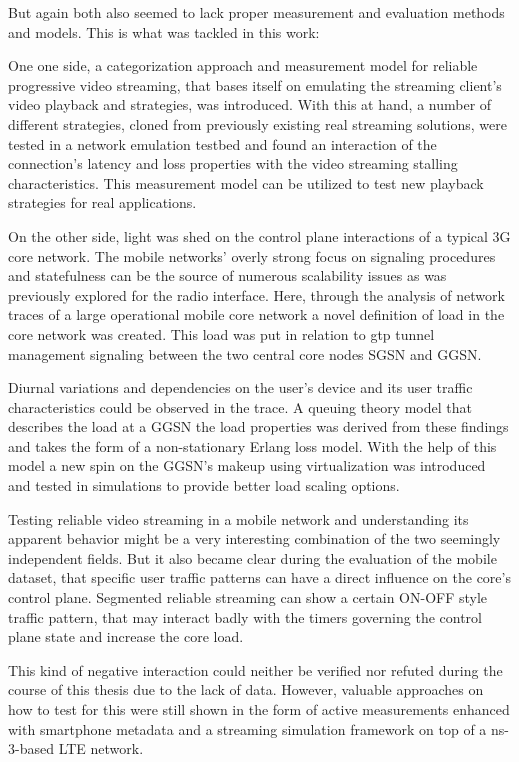 But again both also seemed to lack proper measurement and evaluation methods and models. This is what was tackled in this work: 

One one side, a categorization approach and measurement model for reliable progressive video streaming, that bases itself on emulating the streaming client's video playback and strategies, was introduced. With this at hand, a number of different strategies, cloned from previously existing real streaming solutions, were tested in a network emulation testbed and found an interaction of the connection's latency and loss properties with the video streaming stalling characteristics. This measurement model can be utilized to test new playback strategies for real applications.

On the other side, light was shed on the control plane interactions of a typical \gls{3G} core network. The mobile networks' overly strong focus on signaling procedures and statefulness can be the source of numerous scalability issues as was previously explored for the radio interface. Here, through the analysis of network traces of a large operational mobile core network a novel definition of load in the core network was created. This load was put in relation to \gls{gtp} tunnel management signaling between the two central core nodes \gls{SGSN} and \gls{GGSN}. 

Diurnal variations and dependencies on the user's device and its user traffic characteristics could be observed in the trace. A queuing theory model that describes the load at a \gls{GGSN} the load properties was derived from these findings and takes the form of a non-stationary Erlang loss model. With the help of this model a new spin on the \gls{GGSN}'s makeup using virtualization was introduced and tested in simulations to provide better load scaling options.

Testing reliable video streaming in a mobile network and understanding its apparent behavior might be a very interesting combination of the two seemingly independent fields. But it also became clear during the evaluation of the mobile dataset, that specific user traffic patterns can have a direct influence on the core's control plane. Segmented reliable streaming can show a certain ON-OFF style traffic pattern, that may interact badly with the timers governing the control plane state and increase the core load.

This kind of negative interaction could neither be verified nor refuted during the course of this thesis due to the lack of data. However, valuable approaches on how to test for this were still shown in the form of active measurements enhanced with smartphone metadata and a streaming simulation framework on top of a ns-3-based \gls{LTE} network.

